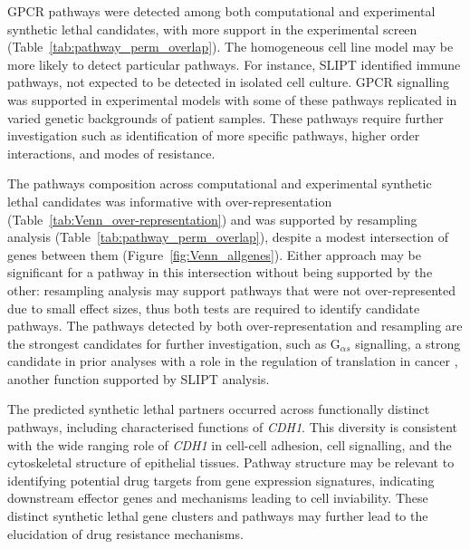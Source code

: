 \gls{GPCR} \glspl{pathway} were detected among both computational and experimental \gls{synthetic lethal} candidates, with more support in the experimental screen (Table~\ref{tab:pathway_perm_overlap}). The homogeneous cell line model may be more likely to detect particular \glspl{pathway}. For instance, \gls{SLIPT} identified immune \glspl{pathway}, not expected to be detected in isolated cell culture. \gls{GPCR} signalling was supported in experimental models \cite{Telford2015} with some of these \glspl{pathway} replicated in varied genetic backgrounds of patient samples. These \glspl{pathway} require further investigation such as identification of more specific \glspl{pathway}, higher order interactions, and modes of resistance.

The \glspl{pathway} composition across computational and experimental \gls{synthetic lethal} candidates was informative with over-represent\-ation (Table~\ref{tab:Venn_over-representation}) and was supported by resampling analysis (Table~\ref{tab:pathway_perm_overlap}), despite a modest intersection of genes between them (Figure~\ref{fig:Venn_allgenes}).
Either approach may be significant for a \gls{pathway} in this intersection without being supported by the other: resampling analysis may support \glspl{pathway} that were not over-represent\-ed due to small effect sizes, thus both tests are required to identify candidate \glspl{pathway}.
The \glspl{pathway} detected by both over-represent\-ation and resampling are the strongest candidates for further investigation, such as G$_{\alpha s}$ signalling, a strong candidate in prior analyses with a role in the regulation of translation in cancer \cite{Gao2015}, another function supported by \gls{SLIPT} analysis.

The predicted \gls{synthetic lethal} partners occurred across functionally distinct \glspl{pathway}, including characterised functions of \textit{CDH1}. This diversity is consistent with the wide ranging role of \textit{CDH1} in cell-cell adhesion, cell signalling, and the cytoskeletal structure of epithelial tissues. Pathway structure may be relevant to identifying potential drug targets from \gls{gene expression} signatures, indicating downstream effector genes and mechanisms leading to cell inviability. These distinct \gls{synthetic lethal} gene clusters and \glspl{pathway} may further lead to the elucidation of drug resistance mechanisms.

